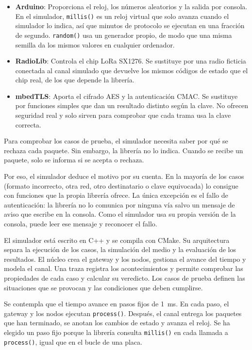 \begin{itemize}
\item \textbf{Arduino}: Proporciona el reloj, los números aleatorios y la salida por consola. En el simulador, \texttt{millis()} es un reloj virtual que solo avanza cuando el simulador lo indica, así que minutos de protocolo se ejecutan en una fracción de segundo. \texttt{random()} usa un generador propio, de modo que una misma semilla da los mismos valores en cualquier ordenador.

\item \textbf{RadioLib}: Controla el chip LoRa SX1276. Se sustituye por una radio ficticia conectada al canal simulado que devuelve los mismos códigos de estado que el chip real, de los que depende la librería.

\item \textbf{mbedTLS}: Aporta el cifrado AES y la autenticación CMAC. Se sustituye por funciones simples que dan un resultado distinto según la clave. No ofrecen seguridad real y solo sirven para comprobar que cada trama usa la clave correcta.
\end{itemize}

Para comprobar los casos de prueba, el simulador necesita saber por qué se rechaza cada paquete. Sin embargo, la librería no lo indica. Cuando se recibe un paquete, solo se informa si se acepta o rechaza.

Por eso, el simulador deduce el motivo por su cuenta. En la mayoría de los casos (formato incorrecto, otra red, otro destinatario o clave equivocada) lo consigue con funciones que la propia librería ofrece. La única excepción es el fallo de autenticación: la librería no lo comunica por ninguna vía salvo un mensaje de aviso que escribe en la consola. Como el simulador usa su propia versión de la consola, puede leer ese mensaje y reconocer el fallo.

El simulador está escrito en C++ y se compila con CMake. Su arquitectura separa la ejecución de los casos, la simulación del medio y la evaluación de los resultados. El núcleo crea el gateway y los nodos, gestiona el avance del tiempo y modela el canal. Una traza registra los acontecimientos y permite comprobar las propiedades de cada caso y calcular su veredicto. Los casos de prueba definen las situaciones que se provocan y las condiciones que deben cumplirse.

Se contempla que el tiempo avance en pasos fijos de 1~ms. En cada paso, el gateway y los nodos ejecutan \texttt{process()}. Después, el canal entrega los paquetes que han terminado, se anotan los cambios de estado y avanza el reloj. Se ha elegido un paso fijo porque la librería consulta \texttt{millis()} en cada llamada a \texttt{process()}, igual que en el bucle de una placa.

